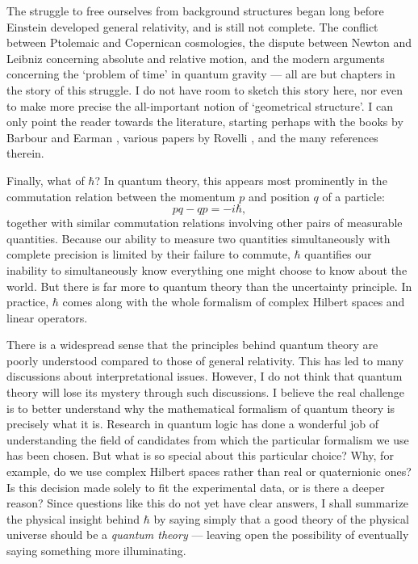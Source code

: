 \documentclass[12pt,amsfonts]{article}
\begin{document}
The struggle to free ourselves from background structures began long
before Einstein developed general relativity, and is still not complete.
The conflict between Ptolemaic and Copernican cosmologies, the dispute
between Newton and Leibniz concerning absolute and relative motion, and
the modern arguments concerning the `problem of time' in quantum gravity
--- all are but chapters in the story of this struggle.  I do not have
room to sketch this story here, nor even to make more precise the
all-important notion of `geometrical structure'.  I can only point the
reader towards the literature, starting perhaps with the books by
Barbour \cite{Barbour} and Earman \cite{Earman}, various papers by
Rovelli \cite{Rovelli1,Rovelli2,Rovelli3}, and the many references therein.  

Finally, what of $\hbar$?  In quantum theory, this appears most 
prominently in the commutation relation between the momentum $p$ and
position $q$ of a particle: 
\[                 pq - qp = -i\hbar  ,\]
together with similar commutation relations involving other pairs of
measurable quantities.   Because our ability to measure two quantities
simultaneously with complete precision is limited by their failure to
commute, $\hbar$ quantifies our inability to simultaneously know
everything one might choose to know about the world.  But there is far
more to quantum theory than the uncertainty principle.  In practice,
$\hbar$ comes along with the whole formalism of complex Hilbert spaces
and linear operators.  

There is a widespread sense that the principles behind quantum theory
are poorly understood compared to those of general relativity.  This has
led to many discussions about interpretational issues.  However, I do
not think that quantum theory will lose its mystery through such
discussions.   I believe the real challenge is to better understand why
the mathematical formalism of quantum theory is precisely what it is. 
Research in quantum logic has done a wonderful job of understanding the
field of candidates from which the particular formalism we use has been
chosen.  But what is so special about this particular choice? 
Why, for example, do we use complex Hilbert spaces rather than real or
quaternionic ones?  Is this decision made solely to fit the experimental
data, or is there a deeper reason?  Since questions like this do not yet
have clear answers, I shall summarize the physical insight behind
$\hbar$ by saying simply that a good theory of the physical universe
should be a {\it quantum theory} --- leaving open the possibility of
eventually saying something more illuminating.
\end{document}
